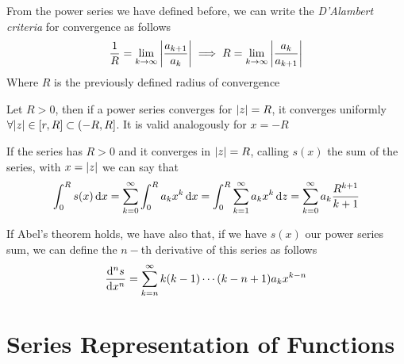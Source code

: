 \documentclass[../complete.tex]{subfiles}
\begin{document}
\begin{thm}
	From the power series we have defined before, we can write the \textit{D'Alambert criteria} for convergence as follows
	\begin{equation}
		\frac{1}{R}=\lim_{k\to\infty}\abs{\frac{a_{k+1}}{a_k}}\implies R=\lim_{k\to\infty}\abs{\frac{a_k}{a_{k+1}}}
		\label{eq:dalambertcriteria}
	\end{equation}
	Where $R$ is the previously defined radius of convergence
\end{thm}
\begin{thm}[Abel]
	Let $R>0$, then if a power series converges for $\abs{z}=R$, it converges uniformly $\forall\abs{z}\in[r,R]\subset(-R,R]$. It is valid analogously for $x=-R$
\end{thm}
\begin{rmk}
	If the series has $R>0$ and it converges in $\abs{z}=R$, calling $s(x)$ the sum of the series, with $x=\abs{z}$ we can say that
	\begin{equation}
		\int_{0}^{R}s(x)\operatorname{d\!} x=\sum_{k=0}^{\infty}\int_{0}^{R}a_kx^k\operatorname{d\!} x=\int_0^R\sum_{k=1}^{\infty}a_kx^k\operatorname{d\!} z=\sum_{k=0}^{\infty}a_k\frac{R^{k+1}}{k+1}
		\label{eq:abelint}
	\end{equation}
\end{rmk}
\begin{rmk}
	If Abel's theorem holds, we have also that, if we have $s(x)$ our power series sum, we can define the $n-$th derivative of this series as follows
	\begin{equation}
		\derivative[n]{s}{x}=\sum_{k=n}^{\infty}k(k-1)\cdots(k-n+1)a_kx^{k-n}
		\label{eq:nthderpowerseries}
	\end{equation}
\end{rmk}
\section{Series Representation of Functions}
\end{document}
